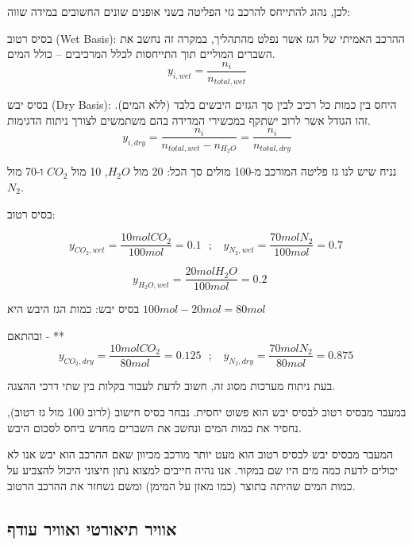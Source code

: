 \documentclass[
  hebrew,
  letterpaper,
  DIV=11,
  numbers=noendperiod]{scrreprt}
\begin{document}
לכן, נהוג להתייחס להרכב גזי הפליטה בשני אופנים שונים החשובים במידה שווה:

בסיס רטוב (Wet Basis): ההרכב האמיתי של הגז אשר נפלט מהתהליך, במקרה זה
נחשב את השברים המוליים תוך התייחסות לכלל המרכיבים -- כולל המים.
\[y_{i,wet} = \frac{n_{i}}{n_{total,wet}}\]

בסיס יבש (Dry Basis): היחס בין כמות כל רכיב לבין סך הגזים היבשים בלבד
(ללא המים). זהו הגודל אשר לרוב ישתקף במכשירי המדידה בהם משתמשים לצורך
ניתוח הדגימות.
\[y_{i,dry} = \frac{n_{i}}{n_{total,wet} - n_{H_{2}O}} = \frac{n_{i}}{n_{total,dry}}\]

נניח שיש לנו גז פליטה המורכב מ-100 מולים סך הכל: 20 מול \(H_{2}O\), 10
מול \(CO_{2}\) ו-70 מול \(N_{2}\).

בסיס רטוב:

\[y_{{CO}_{2},wet} = \frac{10molCO_{2}}{100mol} = 0.1\ \ \ ;\ \ \ \ y_{N_{2},wet} = \frac{70molN_{2}}{100mol} = 0.7\ \]

\[y_{H_{2}O,wet} = \frac{20molH_{2}O}{100mol} = 0.2\ \ \ \ \ \ \]

בסיס יבש: כמות הגז היבש היא \(100mol - 20mol = 80mol\)

ובהתאם - **
\[y_{{CO}_{2},dry} = \frac{10molCO_{2}}{80mol} = 0.125\ \ \ ;\ \ \ \ y_{N_{2},dry} = \frac{70molN_{2}}{80mol} = 0.875\ \]

\begin{tcolorbox}[enhanced jigsaw, colback=white, arc=.35mm, coltitle=black, breakable, toptitle=1mm, leftrule=.75mm, colbacktitle=quarto-callout-tip-color!10!white, opacitybacktitle=0.6, bottomtitle=1mm, titlerule=0mm, opacityback=0, colframe=quarto-callout-tip-color-frame, title=\textcolor{quarto-callout-tip-color}{\faLightbulb}\hspace{0.5em}{עצה}, rightrule=.15mm, bottomrule=.15mm, toprule=.15mm, left=2mm]

בעת ניתוח מערכות מסוג זה, חשוב לדעת לעבור בקלות בין שתי דרכי ההצגה.

במעבר מבסיס רטוב לבסיס יבש הוא פשוט יחסית. נבחר בסיס חישוב (לרוב 100 מול
גז רטוב), נחסיר את כמות המים ונחשב את השברים מחדש ביחס לסכום היבש.

המעבר מבסיס יבש לבסיס רטוב הוא מעט יותר מורכב מכיוון שאם ההרכב הוא יבש
אנו לא יכולים לדעת כמה מים היו שם במקור. אנו נהיה חייבים למצוא נתון
חיצוני היכול להצביע על כמות המים שהיתה בתוצר (כמו מאזן על המימן) ומשם
נשחזר את ההרכב הרטוב.

\end{tcolorbox}

\subsection{אוויר תיאורטי ואוויר
עודף}\label{ux5d0ux5d5ux5d5ux5d9ux5e8-ux5eaux5d9ux5d0ux5d5ux5e8ux5d8ux5d9-ux5d5ux5d0ux5d5ux5d5ux5d9ux5e8-ux5e2ux5d5ux5d3ux5e3}
\end{document}
